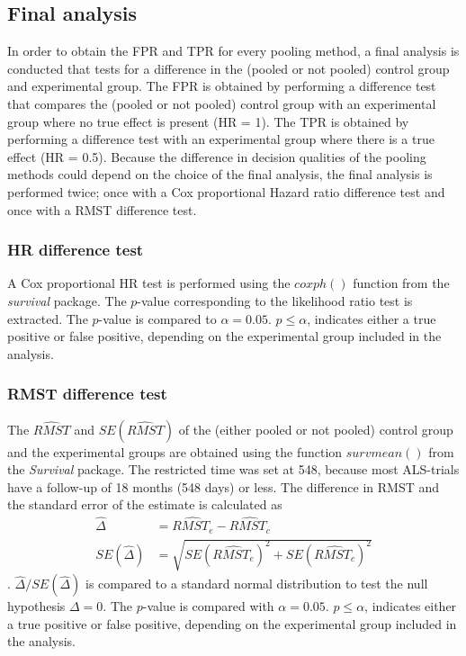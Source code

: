 \documentclass[Royal,sagev,times]{sagej}
\begin{document}
\subsection{Final analysis}
In order to obtain the FPR and TPR for every pooling method, a final analysis is conducted that tests for a difference in the (pooled or not pooled) control group and experimental group. The FPR is obtained by performing a difference test that compares the (pooled or not pooled) control group with an experimental group where no true effect is present (HR = 1). The TPR is obtained by performing a difference test with an experimental group where there is a true effect (HR = 0.5). Because the difference in decision qualities of the pooling methods could depend on the choice of the final analysis, the final analysis is performed twice; once with a Cox proportional Hazard ratio difference test and once with a RMST difference test.

\subsubsection{HR difference test}
A Cox proportional HR test is performed using the $coxph()$ function from the \textit{survival} package\cite{survivalpackage}. The $p$-value corresponding to the likelihood ratio test is extracted. The $p$-value is compared to $\alpha=0.05$. $p \leq \alpha$, indicates either a true positive or false positive, depending on the experimental group included in the analysis. 

\subsubsection{RMST difference test}
The $\hat{RMST}$ and $SE(\hat{RMST})$ of the (either pooled or not pooled) control group and the experimental groups are obtained using the function $survmean()$ from the \textit{Survival} package.\cite{survivalpackage} The restricted time was set at 548, because most ALS-trials have a follow-up of 18 months (548 days) or less.\cite{van2019} The difference in RMST and the standard error of the estimate is calculated as
\begin{align*} \label{RMST CI final}
\hat{\Delta} &= \hat{RMST_{e}} - \hat{RMST_{c}} \\
SE(\hat{\Delta}) &= \sqrt{SE(\hat{RMST_{e}})^2 + SE(\hat{RMST_{c}})^2} 
\end{align*}
.\cite{royston2013} $\hat{\Delta}/SE(\hat{\Delta})$ is compared to a standard normal distribution to test the null hypothesis $\Delta = 0$.\cite{royston2013} The $p$-value is compared with $\alpha=0.05$. $p \leq \alpha$, indicates either a true positive or false positive, depending on the experimental group included in the analysis. 
\end{document}
